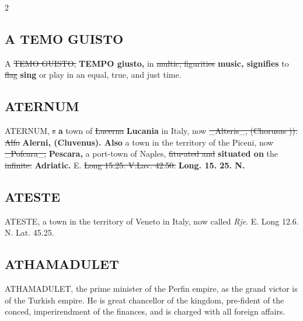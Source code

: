\documentclass[10pt]{article}
\begin{document}
\begin{multicols}{2}
\subsection*{A TEMO GUISTO}
A \sout{TEMO GUISTO,} \textbf{TEMPO giusto,} in \sout{multic, figurities} \textbf{music, signifies} to \sout{flag} \textbf{sing} or play in an equal, true, and just time.

\subsection*{ATERNUM}
ATERNUM, \sout{s} \textbf{a} town of \sout{Lucerna} \textbf{Lucania} in Italy, now \sout{\_Alteris\_, (Chorusas )). Alfo} \textbf{Alerni, (Cluvenus). Also} a town in the territory of the Piceni, now \sout{\_Pofcara\_,} \textbf{Pescara,} a port-town of Naples, \sout{fitu-ated and} \textbf{situated on} the \sout{infinite.} \textbf{Adriatic.} E. \sout{Long 15.25. V.Lav. 42.50.} \textbf{Long. 15. 25. N.}

\subsection*{ATESTE}
ATESTE, a town in the territory of Veneto in Italy, now called \emph{Rje}. E. Long 12.6. N. Lat. 45.25.

\subsection*{ATHAMADULET}
ATHAMADULET, the prime minister of the Perfin empire, as the grand victor is of the Turkish empire. He is great chancellor of the kingdom, pre-fident of the conced, imperirendment of the finances, and is charged with all foreign affairs.


\end{multicols}
\end{document}
